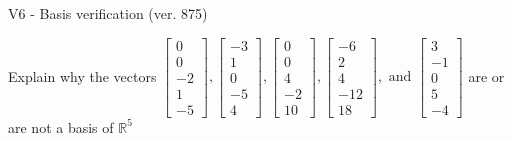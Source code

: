 \begin{exercise}
  \begin{exerciseTitle}V6 - Basis verification (ver. 875)\end{exerciseTitle}
  \begin{exerciseStatement}
    Explain why the vectors \(\left[\begin{array}{r}
0 \\
0 \\
-2 \\
1 \\
-5
\end{array}\right] , \left[\begin{array}{r}
-3 \\
1 \\
0 \\
-5 \\
4
\end{array}\right] , \left[\begin{array}{r}
0 \\
0 \\
4 \\
-2 \\
10
\end{array}\right] , \left[\begin{array}{r}
-6 \\
2 \\
4 \\
-12 \\
18
\end{array}\right] , \text{ and } \left[\begin{array}{r}
3 \\
-1 \\
0 \\
5 \\
-4
\end{array}\right]\) are or are not a basis of \(\mathbb{R}^5\)	



\end{exerciseStatement}
\end{exercise}
